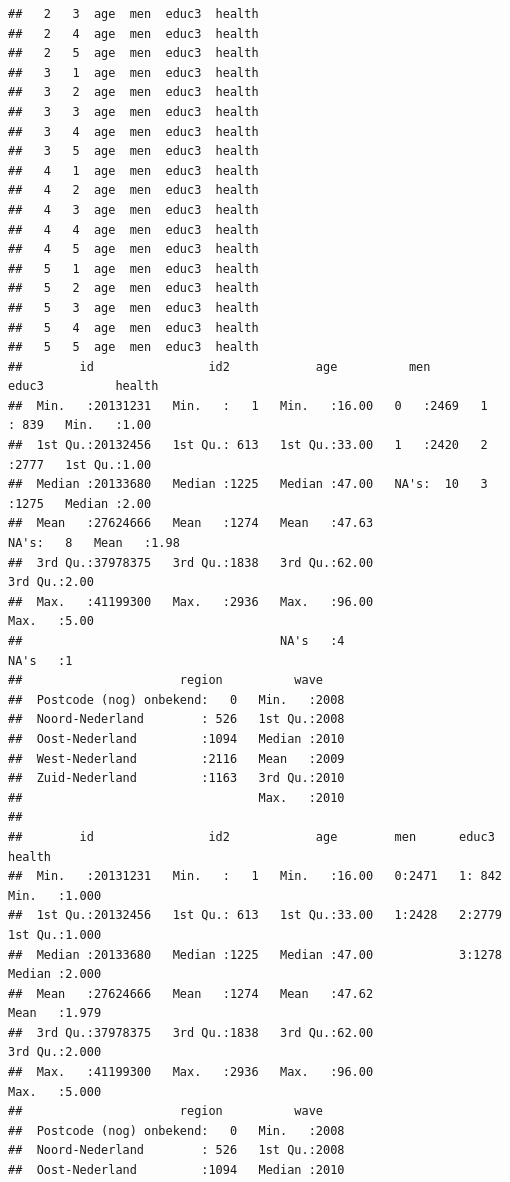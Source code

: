 \documentclass[
]{book}
\begin{document}
\begin{verbatim}
##   2   3  age  men  educ3  health
##   2   4  age  men  educ3  health
##   2   5  age  men  educ3  health
##   3   1  age  men  educ3  health
##   3   2  age  men  educ3  health
##   3   3  age  men  educ3  health
##   3   4  age  men  educ3  health
##   3   5  age  men  educ3  health
##   4   1  age  men  educ3  health
##   4   2  age  men  educ3  health
##   4   3  age  men  educ3  health
##   4   4  age  men  educ3  health
##   4   5  age  men  educ3  health
##   5   1  age  men  educ3  health
##   5   2  age  men  educ3  health
##   5   3  age  men  educ3  health
##   5   4  age  men  educ3  health
##   5   5  age  men  educ3  health
##        id                id2            age          men        educ3          health    
##  Min.   :20131231   Min.   :   1   Min.   :16.00   0   :2469   1   : 839   Min.   :1.00  
##  1st Qu.:20132456   1st Qu.: 613   1st Qu.:33.00   1   :2420   2   :2777   1st Qu.:1.00  
##  Median :20133680   Median :1225   Median :47.00   NA's:  10   3   :1275   Median :2.00  
##  Mean   :27624666   Mean   :1274   Mean   :47.63               NA's:   8   Mean   :1.98  
##  3rd Qu.:37978375   3rd Qu.:1838   3rd Qu.:62.00                           3rd Qu.:2.00  
##  Max.   :41199300   Max.   :2936   Max.   :96.00                           Max.   :5.00  
##                                    NA's   :4                               NA's   :1     
##                      region          wave     
##  Postcode (nog) onbekend:   0   Min.   :2008  
##  Noord-Nederland        : 526   1st Qu.:2008  
##  Oost-Nederland         :1094   Median :2010  
##  West-Nederland         :2116   Mean   :2009  
##  Zuid-Nederland         :1163   3rd Qu.:2010  
##                                 Max.   :2010  
##                                               
##        id                id2            age        men      educ3        health     
##  Min.   :20131231   Min.   :   1   Min.   :16.00   0:2471   1: 842   Min.   :1.000  
##  1st Qu.:20132456   1st Qu.: 613   1st Qu.:33.00   1:2428   2:2779   1st Qu.:1.000  
##  Median :20133680   Median :1225   Median :47.00            3:1278   Median :2.000  
##  Mean   :27624666   Mean   :1274   Mean   :47.62                     Mean   :1.979  
##  3rd Qu.:37978375   3rd Qu.:1838   3rd Qu.:62.00                     3rd Qu.:2.000  
##  Max.   :41199300   Max.   :2936   Max.   :96.00                     Max.   :5.000  
##                      region          wave     
##  Postcode (nog) onbekend:   0   Min.   :2008  
##  Noord-Nederland        : 526   1st Qu.:2008  
##  Oost-Nederland         :1094   Median :2010  

\end{verbatim}
\end{document}
